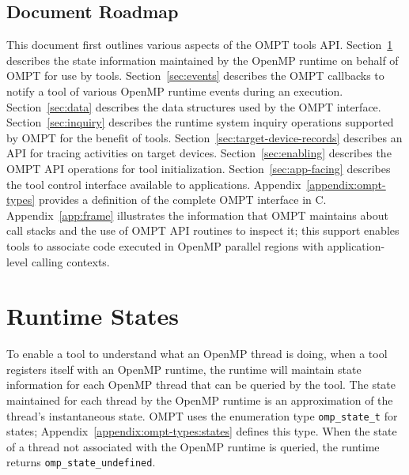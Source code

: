 \documentclass{article}
\begin{document}
\subsection{Document Roadmap}
This document first outlines various aspects of the OMPT tools API. 
Section~\ref{sec:states} describes the state information maintained by the OpenMP runtime on behalf of OMPT for use by tools.
Section~\ref{sec:events} describes the OMPT callbacks to notify a tool of various OpenMP runtime events during an execution.
Section~\ref{sec:data} describes the data structures used by the OMPT interface.
Section~\ref{sec:inquiry} describes the runtime system inquiry operations supported by OMPT for the benefit of tools.
Section~\ref{sec:target-device-records} describes an API for tracing activities on target devices.
Section~\ref{sec:enabling} describes the OMPT API operations for tool initialization.
Section~\ref{sec:app-facing} describes the tool control interface available to applications.
Appendix~\ref{appendix:ompt-types} provides a definition of the complete OMPT interface in C.
Appendix~\ref{app:frame} illustrates the information that OMPT maintains about call stacks and the use of OMPT API routines to inspect it; this support enables tools to associate code executed in OpenMP parallel regions with  application-level calling contexts. 

\section{Runtime States} 
\label{sec:states} 

To enable a tool to understand what an OpenMP thread is doing, when a tool registers itself with an OpenMP runtime, the runtime 
will maintain state information for each OpenMP thread that can be queried by the tool. 
The state maintained for each thread by the OpenMP runtime is an
approximation of the thread's instantaneous state. 
OMPT uses the enumeration type \verb|omp_state_t| for states;
Appendix~\ref{appendix:ompt-types:states} defines this type.
When the state of a thread not associated with the OpenMP runtime is queried, the runtime returns 
\verb|omp_state_undefined|.

\end{document}
